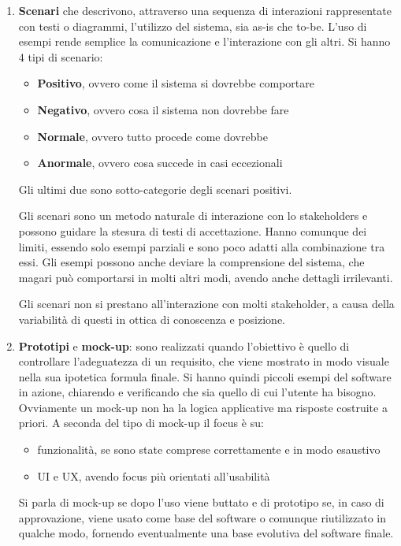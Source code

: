 \begin{itemize}
\begin{enumerate}
              \item \textbf{Scenari} che descrivono, attraverso una sequenza di interazioni
                    rappresentate con testi o diagrammi, l'utilizzo del sistema, sia as-is che
                    to-be. L'uso di esempi rende semplice la comunicazione e l'interazione con
                    gli altri. Si hanno 4 tipi di scenario:
                    \begin{itemize}
                        \item \textbf{Positivo}, ovvero come il sistema si dovrebbe comportare
                        \item \textbf{Negativo}, ovvero cosa il sistema non dovrebbe fare
                        \item \textbf{Normale}, ovvero tutto procede come dovrebbe
                        \item \textbf{Anormale}, ovvero cosa succede in casi eccezionali
                    \end{itemize}
                    Gli ultimi due sono sotto-categorie degli scenari positivi.

                    Gli scenari sono un metodo naturale di interazione con lo stakeholders e
                    possono guidare la stesura di testi di accettazione. Hanno comunque dei
                    limiti, essendo solo esempi parziali e sono poco adatti alla combinazione
                    tra essi. Gli esempi possono anche deviare la comprensione del sistema,
                    che magari può comportarsi in molti altri modi, avendo anche dettagli
                    irrilevanti.

                    Gli scenari non si prestano all'interazione con molti stakeholder, a
                    causa della variabilità di questi in ottica di conoscenza e posizione.
              \item \textbf{Prototipi} e \textbf{mock-up}: sono realizzati quando
                    l'obiettivo è quello di controllare l'adeguatezza di un requisito, che
                    viene mostrato in modo visuale nella sua ipotetica formula finale. Si
                    hanno quindi piccoli esempi del software in azione, chiarendo e verificando
                    che sia quello di cui l'utente ha bisogno. Ovviamente un mock-up non ha
                    la logica applicative ma risposte costruite a priori. A seconda del tipo
                    di mock-up il focus è su:
                    \begin{itemize}
                        \item funzionalità, se sono state comprese correttamente e in modo
                              esaustivo
                        \item UI e UX, avendo focus più orientati all'usabilità
                    \end{itemize}
                    Si parla di mock-up se dopo l'uso viene buttato e di prototipo se, in caso
                    di approvazione, viene usato come base del software o comunque riutilizzato
                    in qualche modo, fornendo eventualmente una base evolutiva del software finale.


\end{enumerate}
\end{itemize}
